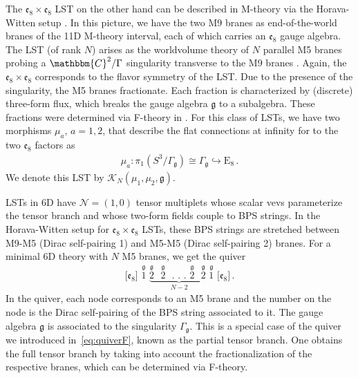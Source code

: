 \documentclass[11pt]{article}
\numberwithin{equation}{section}
\newcommand{\fg}{\mathfrak{g}}
\begin{document}
The $\mathfrak{e}_{8} \times \mathfrak{e}_{8}$ LST on the other hand can be described in M-theory via the Horava-Witten setup \cite{Horava:1995qa}. In this picture, we have the two M9 branes as end-of-the-world branes of the  11D M-theory interval, each of which carries an $\mathfrak{e}_{8}$ gauge algebra. The LST (of rank $N$) arises as the worldvolume theory of $N$ parallel M5 branes probing a $\mathbbm{C}^{2}/\Gamma$ singularity transverse to the M9 branes \cite{Ganor:1996mu}. Again, the $\mathfrak{e}_{8} \times \mathfrak{e}_{8}$ corresponds to the flavor symmetry of the LST. Due to the presence of the singularity, the M5 branes fractionate. Each fraction is characterized by (discrete) three-form flux, which breaks the gauge algebra $\mathfrak{g}$ to a subalgebra. These fractions were determined via F-theory in \cite{DelZotto:2014hpa}. For this class of LSTs, we have two morphisms $\mu_{a}$, $a=1,2$, that describe the flat connections at infinity for to the two $\mathfrak{e}_{8}$ factors as 
\begin{align}
\label{eq:flatcone}
\mu_{a}: \pi_{1}(S^{3}/\Gamma_{\mathfrak{g}}) \cong \Gamma_{\mathfrak{g}} \hookrightarrow \text{E}_{8}\,. 
\end{align}
We denote this LST by $\mathcal{K}_{N}(\mu_{1},\mu_{2},\mathfrak{g})$.

LSTs in 6D have $\mathcal{N}=(1,0)$ tensor multiplets whose scalar vevs parameterize the tensor branch and whose two-form fields couple to BPS strings. In the Horava-Witten setup for $\mathfrak{e}_{8} \times \mathfrak{e}_{8}$ LSTs, these BPS strings are stretched between M9-M5 (Dirac self-pairing 1) and M5-M5 (Dirac self-pairing 2) branes. For a minimal 6D theory with $N$ M5 branes, we get the quiver
\begin{align}
\lbrack  \mathfrak{e}_{8}\rbrack     \, \,
{\overset{\mathfrak{g}}{1}}\, \,
\underbrace{{\overset{\mathfrak{g}}{2}}\, \, \, \,
{\overset{\mathfrak{g}}{2}}\, \,\, \, 
. \, \,
. \, \,
. \, \,
{\overset{\mathfrak{g}}{2}}\, \, \, \,
{\overset{\mathfrak{g}}{2}} \, \,}_{N-2}
{\overset{\mathfrak{g}}{1}}\, \,
\lbrack  \mathfrak{e}_{8}\rbrack     \,.
\end{align}
In the quiver, each node corresponds to an M5 brane and the number on the node is the Dirac self-pairing of the BPS string associated to it. The gauge algebra $\mathfrak{g}$ is associated to the singularity $\Gamma_{\fg}$. This is a special case of the quiver we introduced in~\eqref{eq:quiverF}, known as the partial tensor branch. One obtains the full tensor branch by taking into account the fractionalization of the respective branes, which can be determined via F-theory.
\end{document}
